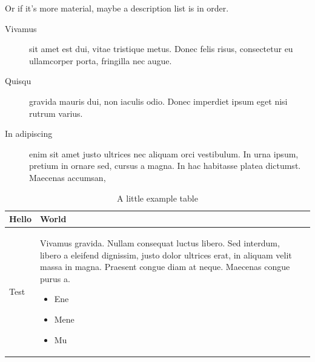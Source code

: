 \documentclass[a4paper,12pt]{book}
\begin{document}
\noindent Or if it's more material, maybe a description list is in order.

\begin{description}
  \item[Vivamus] sit amet est dui, vitae tristique metus. Donec felis risus,
  consectetur eu ullamcorper porta, fringilla nec augue.
  \item[Quisqu] gravida
  mauris dui, non iaculis odio. Donec imperdiet ipsum eget nisi rutrum
  varius.
  \item[In adipiscing] enim sit amet justo ultrices nec aliquam orci
  vestibulum. In urna ipsum, pretium in ornare sed, cursus a magna. In hac
  habitasse platea dictumst. Maecenas accumsan,
\end{description}

\begin{table}[htbp]
\begin{center}
\begin{tabular}{|l|l|r|}
\hline
Hello   & World \\ \hline
Test    &
   \begin{minipage}[t]{8cm}
    Vivamus gravida. Nullam consequat luctus libero. Sed interdum, libero
    a eleifend dignissim, justo dolor ultrices erat, in aliquam velit
    massa in magna. Praesent congue diam at neque. Maecenas congue
    purus a.
    \begin{itemize}
      \item Ene
      \item Mene
      \item Mu
    \end{itemize}
    \vspace*{1ex}
   \end{minipage} \\ \hline
\end{tabular}
\end{center}
\caption{A little example table}
\end{table}
\end{document}
